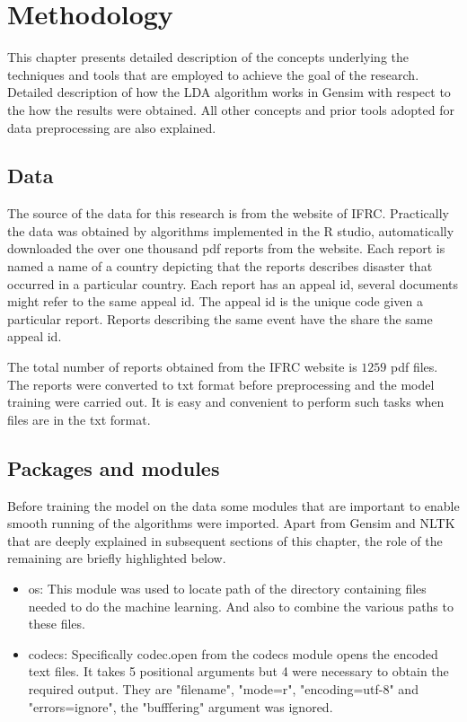 \chapter{Methodology}
This chapter presents detailed description  of the concepts underlying the techniques and tools that are employed to achieve the goal of the research. Detailed description of how the LDA algorithm works in Gensim with respect to the how the results were obtained. All other concepts and prior tools adopted for data preprocessing are also explained.

\section{Data}
\begin{flushleft}
The source of the data for this research is from the website of IFRC. Practically the data was obtained by algorithms implemented in the R studio, automatically downloaded the over one thousand pdf reports from the website. Each report is named a name of a country depicting that the reports describes disaster that occurred in a particular country. Each report has an appeal id, several documents might refer to the same appeal id. The appeal id is the unique code given a particular report. Reports describing the same event have the share the same appeal id.
\end{flushleft}

The total number of reports obtained from the IFRC website is $1259$ pdf files. The reports were converted to txt format before preprocessing and the model training were carried out. It is easy and convenient to perform  such tasks when files are in the txt format.

\section{Packages and modules}
Before training the model on the data some modules that are important to enable smooth running of the algorithms were imported. Apart from Gensim and NLTK that are deeply explained in subsequent sections of this chapter, the role of  the remaining are briefly highlighted below.
\begin{itemize}
\item os: This module was used to locate path of the directory containing files needed to do the machine learning. And also to combine the various paths to these files.
\item codecs: Specifically codec.open from the codecs module opens  the encoded text files. It takes 5 positional arguments but 4 were necessary to obtain the required output. They are "filename", "mode=r", "encoding=utf-8" and "errors=ignore", the "bufffering" argument was ignored.
\end{itemize} 

